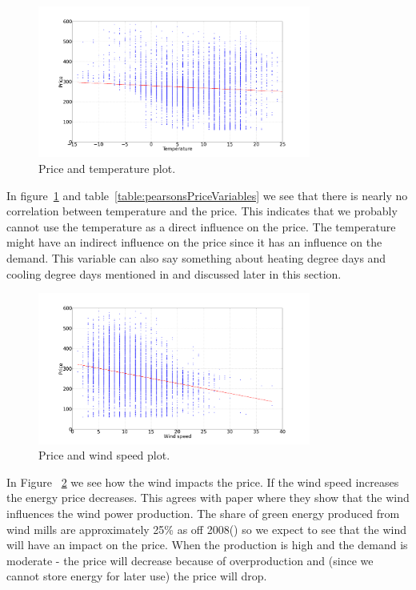 \begin{figure}[H]
\centering
\includegraphics[width=0.8\textwidth]{billeder/energy_price_plots/price_temp.png}
\caption{Price and temperature plot.}
\label{fig:price_temp}
\end{figure}

In figure~\ref{fig:price_temp} and table~\ref{table:pearsonsPriceVariables} we see that there is nearly no correlation between temperature and the price. This indicates that we probably cannot use the temperature as a direct influence on the price. The temperature might have an indirect influence on the price since it has an influence on the demand. This variable can also say something about heating degree days and cooling degree days mentioned in \cite{19} and discussed later in this section.

\begin{figure}[H]
\centering
\includegraphics[width=0.8\textwidth]{billeder/energy_price_plots/price_wind.png}
\caption{Price and wind speed plot.}
\label{fig:price_wind}
\end{figure}

In Figure ~\ref{fig:price_wind} we see how the wind impacts the price. If the wind speed increases the energy price decreases. This agrees with paper \cite{dayAheadImpactOfWindPowerForecasts} where they show that the wind influences the wind power production. The share of green energy produced from wind mills are approximately 25\% as off 2008(\cite{windPowerDanishLiberalized}) so we expect to see that the wind will have an impact on the price. When the production is high and the demand is moderate - the price will decrease because of overproduction and (since we cannot store energy for later use) the price will drop.

